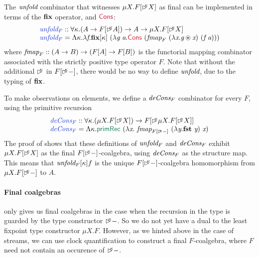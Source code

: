 The $\textit{unfold}$ combinator that witnesses $\mu X. F[\mathord{\rhd\kern-0.4em^{\kappa}}
X]$ as final can be implemented in terms of the $\textbf{fix}$ operator,
and $\cons{Cons}$:
\begin{displaymath}
  \begin{array}[t]{l}
    \defn{unfold$_F$} :: \forall \kappa. (A \to F[\delay\kappa A]) \to A \to \mu X. F[\delay\kappa X] \\
    \defn{unfold$_F$} = \Lambda \kappa.\lambda \ident{f}. \kw{fix}[\kappa]\ (\lambda \ident{g}\ \ident{a}. \cons{Cons}\ (\ident{fmap}_F\ (\lambda \ident{x}. \ident{g} \circledast \ident{x})\ (\ident{f}\ \ident{a})))
  \end{array}
\end{displaymath}
where $\textit{fmap}_F :: (A \to B) \to (F[A] \to F[B])$ is the
functorial mapping combinator associated with the strictly positive
type operator $F$. Note that without the additional $\mathord{\rhd\kern-0.4em^{\kappa}}$ in
$F[\mathord{\rhd\kern-0.4em^{\kappa}} -]$, there would be no way to define $\textit{unfold}$,
due to the typing of $\textbf{fix}$.

To make observations on elements, we define a $\textit{deCons$_F$}$
combinator for every $F$, using the primitive recursion
\begin{displaymath}
  \begin{array}{l}
    \defn{deCons$_F$} :: \forall \kappa. (\mu X. F[\delay\kappa X]) \to F[\delay\kappa \mu X. F[\delay\kappa X]] \\
    \defn{deCons$_F$} = \Lambda \kappa. \elim{primRec}\ (\lambda \ident{x}.\ \ident{fmap}_{F[\delay\kappa-]}\ (\lambda \ident{y}.\kw{fst}\ \ident{y})\ \ident{x})
  \end{array}
\end{displaymath}
The proof of  shows that these
definitions of $\textit{unfold$_F$}$ and $\textit{deCons$_F$}$ exhibit
$\mu X. F[\mathord{\rhd\kern-0.4em^{\kappa}} X]$ as the final $F[\mathord{\rhd\kern-0.4em^{\kappa}}-]$-coalgebra,
using $\textit{deCons$_F$}$ as the structure map. This means that
$\textit{unfold$_F$}[\kappa] f$ is the unique $F[\mathord{\rhd\kern-0.4em^{\kappa}}-]$-coalgebra
homomorphism from $\mu X. F[\mathord{\rhd\kern-0.4em^{\kappa}}-]$ to $A$.

\paragraph{Final coalgebras}
 only gives us final coalgebras in
the case when the recursion in the type is guarded by the type
constructor $\mathord{\rhd\kern-0.4em^{\kappa}}-$. So we do not yet have a dual to the least
fixpoint type constructor $\mu X. F$. However, as we hinted above in
the case of streams, we can use clock quantification to construct a
final $F$-coalgebra, where $F$ need not contain an occurence of
$\mathord{\rhd\kern-0.4em^{\kappa}}-$.

